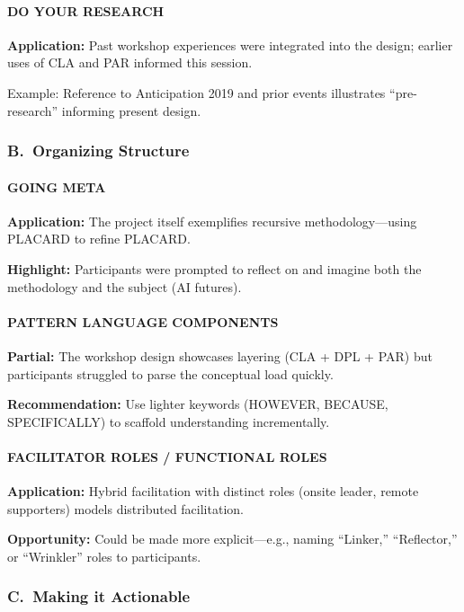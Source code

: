 \documentclass[acmlarge,timestamp]{acmart}
\begin{document}
\paragraph*{DO YOUR RESEARCH}

\noindent \textbf{Application:} Past workshop experiences were integrated into the design; earlier uses of CLA and PAR informed this session.

\noindent Example: Reference to Anticipation 2019 and prior events illustrates “pre-research” informing present design.

\subsubsection*{B.~Organizing Structure}

\paragraph*{GOING META}

\noindent \textbf{Application:} The project itself exemplifies recursive methodology—using PLACARD to refine PLACARD.

\noindent \textbf{Highlight:} Participants were prompted to reflect on and imagine both the methodology and the subject (AI futures).

\paragraph*{PATTERN LANGUAGE COMPONENTS}

\noindent \textbf{Partial:} The workshop design showcases layering (CLA + DPL + PAR) but participants struggled to parse the conceptual load quickly.

\noindent \textbf{Recommendation:} Use lighter keywords (HOWEVER, BECAUSE, SPECIFICALLY) to scaffold understanding incrementally.

\paragraph*{FACILITATOR ROLES / FUNCTIONAL ROLES}

\noindent \textbf{Application:} Hybrid facilitation with distinct roles (onsite leader, remote supporters) models distributed facilitation.

\noindent \textbf{Opportunity:} Could be made more explicit—e.g., naming “Linker,” “Reflector,” or “Wrinkler” roles to participants.

\subsubsection*{C.~Making it Actionable}
\end{document}
